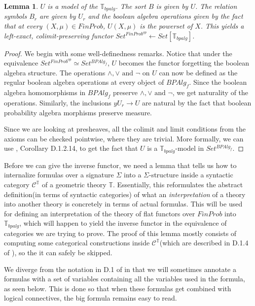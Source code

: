 \documentclass[a4paper]{amsproc}
\theoremstyle{plain}
\newtheorem{lemma}{Lemma}[section]
\theoremstyle{definition}
\theoremstyle{remark}
\numberwithin{equation}{section}
\begin{document}
\begin{lemma} \label{universal model}
$U$ is a model of the $\mathbb{T}_{bpalg}$. The sort $B$ is given by $U$. The relation symbols $B_r$ are given by $U_r$ and the boolean algebra operations given by the fact that at every $(X,\mu) \in FinProb$, $U(X, \mu)$ is the powerset of $X$. This yields a left-exact, colimit-preserving functor $Set^{FinProb^{op}} \leftarrow Set[\mathbb{T}_{bpalg}]$.
\end{lemma}
\begin{proof}
We begin with some well-definedness remarks. Notice that under the equivalence $Set^{FinProb^{op}} \simeq Set^{BPAlg_f}$, $U$ becomes the functor forgetting the boolean algebra structure. The operations $\wedge, \vee \text{ and } \neg$ on $U$ can now be defined as the regular boolean algebra operations at every object of $BPAlg_f$. Since the boolean algebra homomorphisms in $BPAlg_f$ preserve $\wedge, \vee \text{ and } \neg$, we get naturality of the operations. Similarly, the inclusions $y U_r \to U$ are natural by the fact that boolean probability algebra morphisms preserve measure.

Since we are looking at presheaves, all the colimit and limit conditions from the axioms can be checked pointwise, where they are trivial. More formally, we can use \cite{elephant}, Corollary D.1.2.14, to get the fact that $U$ is a $\mathbb{T}_{bpalg}$-model in $Set^{BPAlg_f}$.
\end{proof}

Before we can give the inverse functor, we need a lemma that tells us how to internalize formulas over a signature $\Sigma$ into a $\Sigma$-structure inside a syntactic category $\mathcal{C}^{\mathbb{T}}$ of a geometric theory $\mathbb{T}$. Essentially, this reformulates the abstract definition(in terms of syntactic categories) of what an \textit{interpretation} of a theory into another theory is concretely in terms of actual formulas. This will be used for defining an interpretation of the theory of flat functors over $FinProb$ into $\mathbb{T}_{bpalg}$, which will happen to yield the inverse functor in the equivalence of categories we are trying to prove. The proof of this lemma mostly consists of computing some categorical constructions inside $\mathcal{C}^{\mathbb{T}}$(which are described in D.1.4 of \cite{elephant}), so the it can safely be skipped.

We diverge from the notation in D.1 of \cite{elephant} in that we will sometimes annotate a formulas with a set of variables containing all the variables used in the formula, as seen below. This is done so that when these formulas get combined with logical connectives, the big formula remains easy to read.
\end{document}
